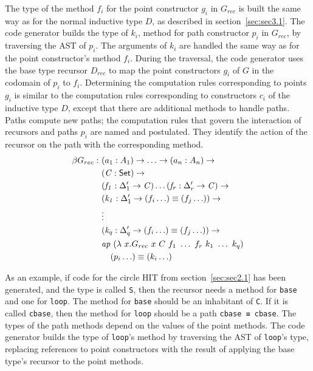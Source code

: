 \documentclass[sigplan,10pt]{acmart}
\begin{document}
The type of the method $f_i$ for the point constructor $g_i$ in $G_{rec}$ is built the same way as for the normal inductive type $D$, as described in section~\ref{sec:sec3.1}.
The code generator builds the type of $k_i$, method for path constructor $p_i$ in $G_{rec}$, by traversing the AST of $p_i$. The arguments of $k_i$ are handled the same way as for the point constructor's method $f_i$. During the traversal, the code generator uses the base type recursor $D_{rec}$ to map the point constructors $g_i$ of $G$ in the codomain of $p_i$ to $f_i$. Determining the computation rules corresponding to points $g_i$ is similar to the computation rules corresponding to constructors $c_i$ of the inductive type $D$, except that there are additional methods to handle paths. Paths compute new paths; the computation rules that govern the interaction of recursors and paths $p_i$ are named and postulated. They identify the action of the recursor on the path with the corresponding method.
\begin{align*}
\beta G_{rec} :\ & (a_1 : A_1) \to \ldots \to (a_n : A_n) \to\\
& (\mathit{C} : \SET{}) \to \\
& (\mathit{f_1} : \Delta_1^\prime \to \mathit{C}) \ldots (\mathit{f_r} : \Delta_r^\prime \to \mathit{C}) \to \\
& (\mathit{k_1} : \Delta_1^\prime \to (f_i \ldots) \equiv (f_j \ldots)) \to \\
& \vdots \\
& (\mathit{k_q} : \Delta_q^\prime \to (f_i \ldots) \equiv (f_j \ldots)) \to \\
& \mathit{ap} \  (\lambda \  x . G_{rec} \  x \  C \  f_1 \  \ldots\ f_r \  k_1 \ \ldots\  k_q)\\
& \hspace{0.25cm} \  (p_i \ldots) \equiv (k_i \ldots)
\end{align*}


As an example, if code for the circle HIT from section~\ref{sec:sec2.1} has been generated, and the type is called \texttt{S}, then the recursor needs a method for \texttt{base} and one for \texttt{loop}.
The method for \texttt{base} should be an inhabitant of \texttt{C}.
If it is called \texttt{cbase}, then the method for \texttt{loop} should be a path \texttt{cbase ≡ cbase}.
The types of the path methods depend on the values of the point methods.
The code generator builds the type of \texttt{loop}'s method by traversing the AST of \texttt{loop}'s type,
replacing references to point constructors with the result of applying the base type's recursor to the point methods.
\end{document}
